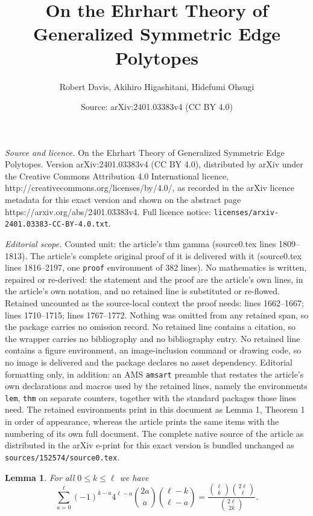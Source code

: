 \documentclass[10pt,a4paper]{amsart}
\title{On the Ehrhart Theory of Generalized Symmetric Edge Polytopes}
\author{Robert Davis, Akihiro Higashitani, Hidefumi Ohsugi}
\date{Source: arXiv:2401.03383v4 (CC BY 4.0)}
\newtheorem{lem}{Lemma}
\begin{document}
\maketitle

\noindent\emph{Source and licence.} On the Ehrhart Theory of Generalized Symmetric Edge Polytopes. Version arXiv:2401.03383v4 (CC BY 4.0), distributed by arXiv under the Creative Commons Attribution 4.0 International licence, http://creativecommons.org/licenses/by/4.0/, as recorded in the arXiv licence metadata for this exact version and shown on the abstract page https://arxiv.org/abs/2401.03383v4. Full licence notice: \texttt{licenses/arxiv-2401.03383-CC-BY-4.0.txt}.\par\smallskip

\noindent\textit{Editorial scope.} Counted unit: the article's thm gamma (source0.tex lines 1809--1813). The article's complete original proof of it is delivered with it (source0.tex lines 1816--2197, one \texttt{proof} environment of 382 lines). No mathematics is written, repaired or re-derived: the statement and the proof are the article's own lines, in the article's own notation, and no retained line is substituted or re-flowed.  Retained uncounted as the source-local context the proof needs: lines 1662--1667; lines 1710--1715; lines 1767--1772.  Nothing was omitted from any retained span, so the package carries no omission record.  No retained line contains a citation, so the wrapper carries no bibliography and no bibliography entry.  No retained line contains a figure environment, an image-inclusion command or drawing code, so no image is delivered and the package declares no asset dependency.  Editorial formatting only, in addition: an AMS \texttt{amsart} preamble that restates the article's own declarations and macros used by the retained lines, namely the environments \texttt{lem}, \texttt{thm} on separate counters, together with the standard packages those lines need.  The retained environments print in this document as Lemma 1, Theorem 1 in order of appearance, whereas the article prints the same items with the numbering of its own full document.  The complete native source of the article as distributed in the arXiv e-print for this exact version is bundled unchanged as \texttt{sources/152574/source0.tex}.
\begin{lem}\label{hodai1}
    For all $0 \leq k \leq \ell$ we have
    \[
        \sum_{a = 0}^\ell(-1)^{k-a}4^{\ell-a} \binom{2a}{a} \binom{\ell-k}{\ell-a} = \frac{\binom{\ell}{k} \binom{2\ell}{\ell}}{ \binom{2\ell}{2k}}.
    \]    
\end{lem}
\end{document}
